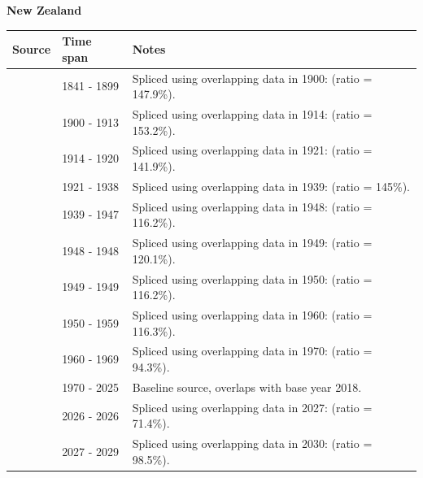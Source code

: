 \documentclass[12pt,a4paper,landscape]{article}
\begin{document}
\begin{adjustbox}{max totalsize={\paperwidth}{\paperheight},center}
\begin{minipage}[t][\textheight][t]{\textwidth}
\vspace*{0.5cm}
{}
\begin{center}
{\Large\bfseries New Zealand}
\end{center}
\vspace{0.5cm}
\begin{table}[H]
\centering
\small
\begin{tabular}{|l|l|l|}
\hline
\textbf{Source} & \textbf{Time span} & \textbf{Notes} \\
\hline
\rowcolor{white}\cite{Tena}& 1841 - 1899 &Spliced using overlapping data in 1900: (ratio = 147.9\%).\\
\rowcolor{lightgray}\cite{UN_trade}& 1900 - 1913 &Spliced using overlapping data in 1914: (ratio = 153.2\%).\\
\rowcolor{white}\cite{Tena}& 1914 - 1920 &Spliced using overlapping data in 1921: (ratio = 141.9\%).\\
\rowcolor{lightgray}\cite{UN_trade}& 1921 - 1938 &Spliced using overlapping data in 1939: (ratio = 145\%).\\
\rowcolor{white}\cite{Mitchell}& 1939 - 1947 &Spliced using overlapping data in 1948: (ratio = 116.2\%).\\
\rowcolor{lightgray}\cite{UN_trade}& 1948 - 1948 &Spliced using overlapping data in 1949: (ratio = 120.1\%).\\
\rowcolor{white}\cite{Mitchell}& 1949 - 1949 &Spliced using overlapping data in 1950: (ratio = 116.2\%).\\
\rowcolor{lightgray}\cite{UN_trade}& 1950 - 1959 &Spliced using overlapping data in 1960: (ratio = 116.3\%).\\
\rowcolor{white}\cite{AMECO}& 1960 - 1969 &Spliced using overlapping data in 1970: (ratio = 94.3\%).\\
\rowcolor{lightgray}\cite{OECD_EO}& 1970 - 2025 &Baseline source, overlaps with base year 2018.\\
\rowcolor{white}\cite{AMECO}& 2026 - 2026 &Spliced using overlapping data in 2027: (ratio = 71.4\%).\\
\rowcolor{lightgray}\cite{IMF_WEO_forecast}& 2027 - 2029 &Spliced using overlapping data in 2030: (ratio = 98.5\%).\\
\hline
\end{tabular}
\end{table}

\end{minipage}
\end{adjustbox}
\end{document}
